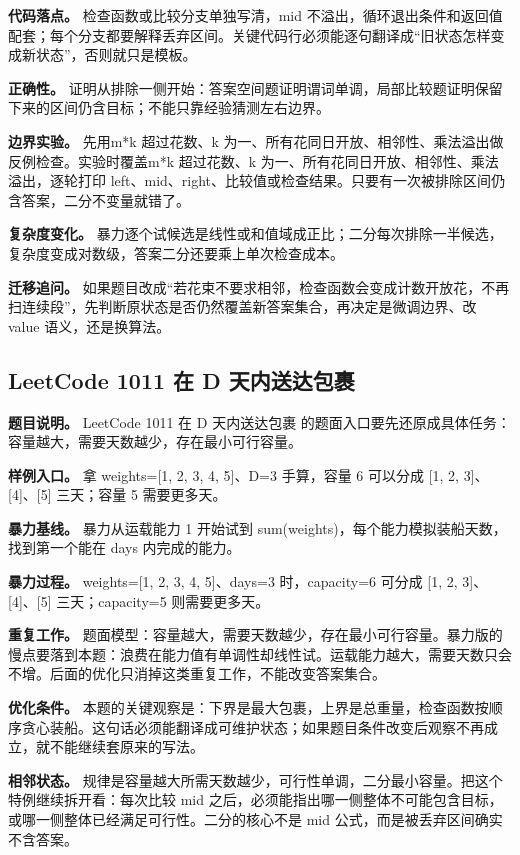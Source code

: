 \textbf{代码落点。} 检查函数或比较分支单独写清，mid 不溢出，循环退出条件和返回值配套；每个分支都要解释丢弃区间。关键代码行必须能逐句翻译成“旧状态怎样变成新状态”，否则就只是模板。

\textbf{正确性。} 证明从排除一侧开始：答案空间题证明谓词单调，局部比较题证明保留下来的区间仍含目标；不能只靠经验猜测左右边界。

\textbf{边界实验。} 先用m*k 超过花数、k 为一、所有花同日开放、相邻性、乘法溢出做反例检查。实验时覆盖m*k 超过花数、k 为一、所有花同日开放、相邻性、乘法溢出，逐轮打印 left、mid、right、比较值或检查结果。只要有一次被排除区间仍含答案，二分不变量就错了。

\textbf{复杂度变化。} 暴力逐个试候选是线性或和值域成正比；二分每次排除一半候选，复杂度变成对数级，答案二分还要乘上单次检查成本。

\textbf{迁移追问。} 如果题目改成“若花束不要求相邻，检查函数会变成计数开放花，不再扫连续段”，先判断原状态是否仍然覆盖新答案集合，再决定是微调边界、改 value 语义，还是换算法。

\subsection{LeetCode 1011 在 D 天内送达包裹}

\textbf{题目说明。} LeetCode 1011 在 D 天内送达包裹 的题面入口要先还原成具体任务：容量越大，需要天数越少，存在最小可行容量。

\textbf{样例入口。} 拿 weights=[1, 2, 3, 4, 5]、D=3 手算，容量 6 可以分成 [1, 2, 3]、[4]、[5] 三天；容量 5 需要更多天。

\textbf{暴力基线。} 暴力从运载能力 1 开始试到 sum(weights)，每个能力模拟装船天数，找到第一个能在 days 内完成的能力。

\textbf{暴力过程。} weights=[1, 2, 3, 4, 5]、days=3 时，capacity=6 可分成 [1, 2, 3]、[4]、[5] 三天；capacity=5 则需要更多天。

\textbf{重复工作。} 题面模型：容量越大，需要天数越少，存在最小可行容量。暴力版的慢点要落到本题：浪费在能力值有单调性却线性试。运载能力越大，需要天数只会不增。后面的优化只消掉这类重复工作，不能改变答案集合。

\textbf{优化条件。} 本题的关键观察是：下界是最大包裹，上界是总重量，检查函数按顺序贪心装船。这句话必须能翻译成可维护状态；如果题目条件改变后观察不再成立，就不能继续套原来的写法。

\textbf{相邻状态。} 规律是容量越大所需天数越少，可行性单调，二分最小容量。把这个特例继续拆开看：每次比较 mid 之后，必须能指出哪一侧整体不可能包含目标，或哪一侧整体已经满足可行性。二分的核心不是 mid 公式，而是被丢弃区间确实不含答案。

